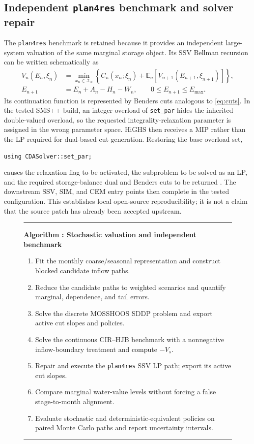 \documentclass[11pt,a4paper]{article}
\newcommand{\E}{\mathbb{E}}
\newcounter{algctr}
\newenvironment{algorithmblock}[1]{%
  \refstepcounter{algctr}\begin{figure}[t]\small\hrule\vspace{3pt}%
  \noindent\textbf{Algorithm \thealgctr: #1}\par\vspace{2pt}%
}{\vspace{2pt}\hrule\end{figure}}
\begin{document}
\subsection{Independent \texttt{plan4res} benchmark and solver repair}\label{sec:p4r}
The \texttt{plan4res} benchmark is retained because it provides an independent
large-system valuation of the same marginal storage object. Its SSV Bellman
recursion can be written schematically as
\begin{align}
V_n(E_n,\xi_n)&=\min_{x_n\in\mathcal X_n}
\left\{C_n(x_n;\xi_n)+\E_n[V_{n+1}(E_{n+1},\xi_{n+1})]\right\},
\label{eq:p4r-bellman}\\
E_{n+1}&=E_n+A_n-H_n-W_n,
\qquad 0\le E_{n+1}\le E_{\max}.
\label{eq:p4r-balance}
\end{align}
Its continuation function is represented by Benders cuts analogous to
\eqref{eq:cuts}. In the tested SMS++ build, an integer overload of
\texttt{set\_par} hides the inherited double-valued overload, so the requested
integrality-relaxation parameter is assigned in the wrong parameter space. HiGHS
then receives a MIP rather than the LP required for dual-based cut generation.
Restoring the base overload set,
\begin{center}
\texttt{using CDASolver::set\_par;}
\end{center}
causes the relaxation flag to be activated, the subproblem to be solved as an LP,
and the required storage-balance dual and Benders cuts to be returned
\cite{huangfu2018}. The downstream SSV, SIM, and CEM entry points then complete
in the tested configuration. This establishes local open-source reproducibility;
it is not a claim that the source patch has already been accepted upstream.

\begin{algorithmblock}{Stochastic valuation and independent benchmark}
\begin{enumerate}[leftmargin=1.5em,itemsep=1pt]
\item Fit the monthly coarse/seasonal representation and construct blocked candidate inflow paths.
\item Reduce the candidate paths to weighted scenarios and quantify marginal, dependence, and tail errors.
\item Solve the discrete MOSSHOOS SDDP problem and export active cut slopes and policies.
\item Solve the continuous CIR--HJB benchmark with a nonnegative inflow-boundary treatment and compute $-V_s$.
\item Repair and execute the \texttt{plan4res} SSV LP path; export its active cut slopes.
\item Compare marginal water-value levels without forcing a false stage-to-month alignment.
\item Evaluate stochastic and deterministic-equivalent policies on paired Monte Carlo paths and report uncertainty intervals.
\end{enumerate}
\end{algorithmblock}
\end{document}
